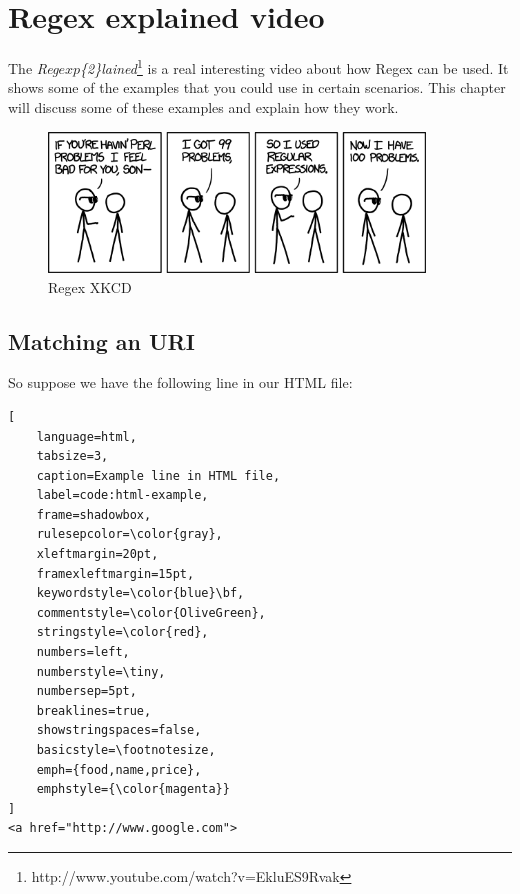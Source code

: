 \chapter{Regex explained video}
\label{chap:regex-explained}

The \textit{Reg\(exp\)\{2\}lained}\footnote{http://www.youtube.com/watch?v=EkluES9Rvak}  is a real interesting video about how Regex can be used. It shows some of the examples that you could use in certain scenarios. This chapter will discuss some of these examples and explain how they work.

\begin{figure}[ht]
\begin{center}
\includegraphics[width=10cm]{Chapters/04_perl_problems.png}
\end{center}
\caption{Regex XKCD\footnotemark}
\label{img:regex-xkcd}
\end{figure}


\section{Matching an URI}
\label{sec:matching-an-uri}
So suppose we have the following line in our HTML file:
\begin{lstlisting}[
	language=html,
	tabsize=3,
	caption=Example line in HTML file,
	label=code:html-example,
	frame=shadowbox,
	rulesepcolor=\color{gray},
	xleftmargin=20pt,
	framexleftmargin=15pt,
	keywordstyle=\color{blue}\bf,
	commentstyle=\color{OliveGreen},
	stringstyle=\color{red},
	numbers=left,
	numberstyle=\tiny,
	numbersep=5pt,
	breaklines=true,
	showstringspaces=false,
	basicstyle=\footnotesize,
	emph={food,name,price},
	emphstyle={\color{magenta}}
]
<a href="http://www.google.com">
\end{lstlisting}

